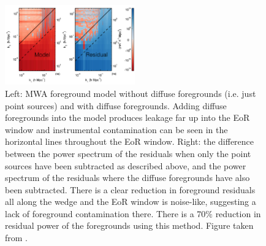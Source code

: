 \begin{figure}
\begin{center}
    \includegraphics[width=0.5\textwidth]{Images/apjaa3b64f9_hr.png}
\end{center}
\caption{Left: MWA foreground model without diffuse foregrounds (i.e. just point sources) and with diffuse foregrounds. Adding diffuse foregrounds into the model produces leakage far up into the EoR window and instrumental contamination can be seen in the horizontal lines throughout the EoR window. Right: the difference between the power spectrum of the residuals when only the point sources have been subtracted as described above, and the power spectrum of the residuals where the diffuse foregrounds have also been subtracted. There is a clear reduction in foreground residuals all along the wedge and the EoR window is noise-like, suggesting a lack of foreground contamination there. There is a 70$\%$ reduction in residual power of the foregrounds using this method. Figure taken from \citet{Beardsley2016ApJ...833..102B}.}
    \label{fig:beardsley_fg_sub}
\end{figure}


